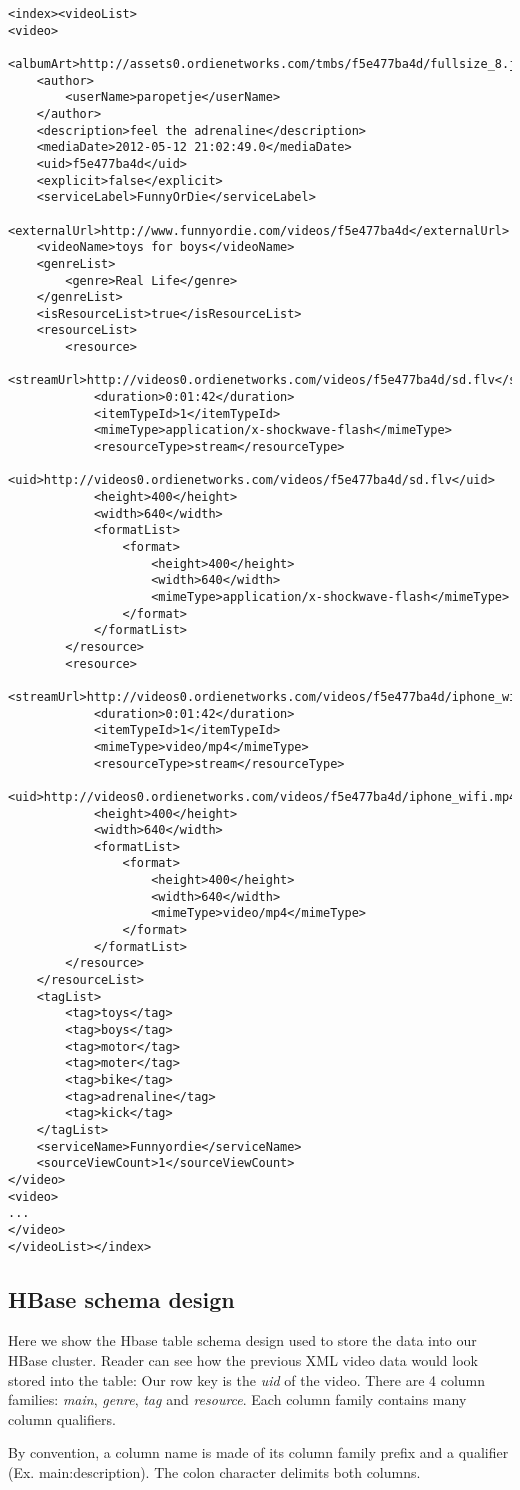 \lstset{language=XML, basicstyle=\footnotesize, numbers=left, breaklines=true}
\begin{lstlisting}
<index><videoList>
<video>
	<albumArt>http://assets0.ordienetworks.com/tmbs/f5e477ba4d/fullsize_8.jpg</albumArt>
	<author>
		<userName>paropetje</userName>
	</author>
	<description>feel the adrenaline</description>
	<mediaDate>2012-05-12 21:02:49.0</mediaDate>
	<uid>f5e477ba4d</uid>
	<explicit>false</explicit>
	<serviceLabel>FunnyOrDie</serviceLabel>
	<externalUrl>http://www.funnyordie.com/videos/f5e477ba4d</externalUrl>
	<videoName>toys for boys</videoName>
	<genreList>
		<genre>Real Life</genre>
	</genreList>
	<isResourceList>true</isResourceList>
	<resourceList>
		<resource>
			<streamUrl>http://videos0.ordienetworks.com/videos/f5e477ba4d/sd.flv</streamUrl>
			<duration>0:01:42</duration>
			<itemTypeId>1</itemTypeId>
			<mimeType>application/x-shockwave-flash</mimeType>
			<resourceType>stream</resourceType>
			<uid>http://videos0.ordienetworks.com/videos/f5e477ba4d/sd.flv</uid>
			<height>400</height>
			<width>640</width>
			<formatList>
				<format>
					<height>400</height>
					<width>640</width>
					<mimeType>application/x-shockwave-flash</mimeType>
				</format>
			</formatList>
		</resource>
		<resource>
			<streamUrl>http://videos0.ordienetworks.com/videos/f5e477ba4d/iphone_wifi.mp4</streamUrl>
			<duration>0:01:42</duration>
			<itemTypeId>1</itemTypeId>
			<mimeType>video/mp4</mimeType>
			<resourceType>stream</resourceType>
			<uid>http://videos0.ordienetworks.com/videos/f5e477ba4d/iphone_wifi.mp4</uid>
			<height>400</height>
			<width>640</width>
			<formatList>
				<format>
					<height>400</height>
					<width>640</width>
					<mimeType>video/mp4</mimeType>
				</format>
			</formatList>
		</resource>
	</resourceList>
	<tagList>
		<tag>toys</tag>
		<tag>boys</tag>
		<tag>motor</tag>
		<tag>moter</tag>
		<tag>bike</tag>
		<tag>adrenaline</tag>
		<tag>kick</tag>
	</tagList>
	<serviceName>Funnyordie</serviceName>
	<sourceViewCount>1</sourceViewCount>
</video>
<video>
...
</video>
</videoList></index>
\end{lstlisting}


\subsection{HBase schema design}

Here we show the Hbase table schema design used to store the data into our HBase cluster. Reader can see how the previous XML video data would look stored into the table: Our row key is the \textit{uid} of the video. There are 4 column families: \textit{main}, \textit{genre}, \textit{tag} and \textit{resource}. Each column family contains many column qualifiers.
\par
By convention, a column name is made of its column family prefix and a qualifier (Ex. main:description). The colon character delimits both columns.


